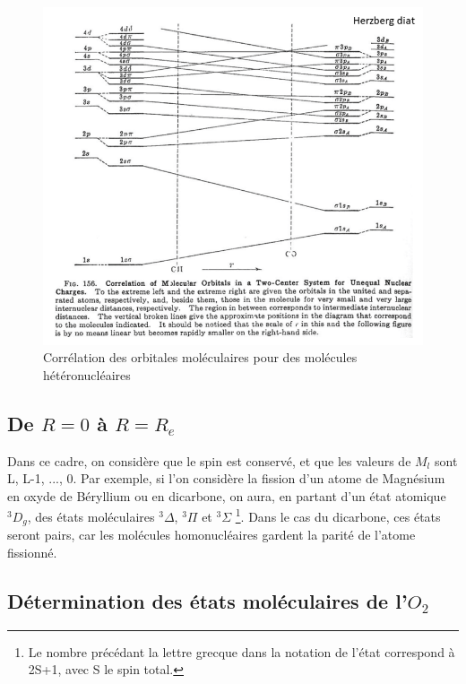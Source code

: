 \begin{figure}
    \centering
    \includegraphics[scale=0.45]{Images3/Corrélation hétéronucléaire.png}
    \caption{Corrélation des orbitales moléculaires pour des molécules hétéronucléaires}
\end{figure}
\clearpage

\subsection{De $R=0$ à $R=R_e$}

Dans ce cadre, on considère que le spin est conservé, et que les valeurs de $M_l$ sont L, L-1, ..., 0. Par exemple, si l'on considère la fission d'un atome de Magnésium en oxyde de Béryllium ou en dicarbone, on aura, en partant d'un état atomique $^3D_g$, des états moléculaires $^3\Delta$, $^3\Pi$ et $^3\Sigma$ \footnote{Le nombre précédant la lettre grecque dans la notation de l'état correspond à 2S+1, avec S le spin total.}. Dans le cas du dicarbone, ces états seront pairs, car les molécules homonucléaires gardent la parité de l'atome fissionné. 

\subsection{Détermination des états moléculaires de l'$O_2$}

